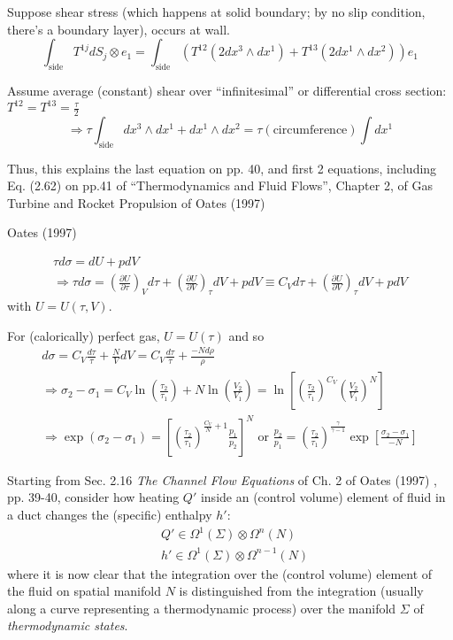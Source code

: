 \documentclass[10pt]{amsart}
\begin{document}
\begin{multicols*}{2}
Suppose shear stress (which happens at solid boundary; by no slip condition, there's a boundary layer), occurs at wall.  
\[
\int_{\text{side}}T^{1j}dS_j \otimes e_1 = \int_{\text{side}} (T^{12} (2dx^3 \wedge dx^1) + T^{13} (2dx^1 \wedge dx^2 ) ) e_1
\]

Assume average (constant) shear over ``infinitesimal'' or differential cross section: $T^{12}=T^{13} = \frac{\tau}{2}$
\[
\Longrightarrow \tau \int_{\text{side}} dx^3 \wedge dx^1 + dx^1 \wedge dx^2 = \tau (\text{circumference}) \int dx^1
\]

Thus, this explains the last equation on pp. 40, and first 2 equations, including Eq. (2.62) on pp.41 of ``Thermodynamics and Fluid Flows'', Chapter 2, of  Gas Turbine and Rocket Propulsion of Oates (1997) \cite{GOates1997}



Oates (1997) \cite{GOates1997}

\[
\begin{gathered}
  \tau d\sigma = dU + pdV \\
  \Longrightarrow \tau d\sigma = \left( \frac{ \partial U}{ \partial \tau} \right)_V d\tau  + \left( \frac{ \partial U}{ \partial V} \right)_{\tau} dV + p dV \equiv C_V d\tau + \left( \frac{ \partial U}{ \partial V} \right)_{\tau} dV + pdV
\end{gathered}
\]
with $U = U(\tau,V)$.  

For (calorically) perfect gas, $U=U(\tau)$ and so
\[
\begin{gathered}
  d\sigma = C_V \frac{d\tau}{\tau} + \frac{N}{V} dV = C_V \frac{d\tau}{\tau} + \frac{-Nd\rho }{\rho} \\
  \Longrightarrow \sigma_2 - \sigma_1 = C_V \ln{ \left( \frac{\tau_2}{\tau_1} \right) } + N \ln{ \left( \frac{V_2}{V_1} \right)} = \ln{ \left[ \left( \frac{\tau_2}{\tau_1} \right)^{C_V} \left( \frac{V_2}{V_1} \right)^N \right] } \\
  \Longrightarrow \exp{ ( \sigma_2 - \sigma_1) } = \left[ \left( \frac{\tau_2}{\tau_1} \right)^{ \frac{C_V}{N} + 1 } \frac{p_1}{p_2} \right]^{N} \text{ or } \frac{p_2}{p_1} = \left( \frac{\tau_2}{\tau_1} \right)^{\frac{\gamma}{\gamma-1}} \exp{ \left[ \frac{\sigma_2-\sigma_1}{-N} \right] }
\end{gathered}
\]

Starting from Sec. 2.16 \emph{The Channel Flow Equations} of Ch. 2 of Oates (1997) \cite{GOates1997}, pp. 39-40, consider how heating $Q'$ inside an (control volume) element of fluid in a duct changes the (specific) enthalpy $h'$:
\[
\begin{aligned}
  & Q' \in \Omega^1(\Sigma) \otimes \Omega^n(N) \\ 
  & h' \in \Omega^1(\Sigma) \otimes \Omega^{n-1}(N)
\end{aligned}
\]
where it is now clear that the integration over the (control volume) element of the fluid on spatial manifold $N$ is distinguished from the integration (usually along a curve representing a thermodynamic process) over the manifold $\Sigma$ of \emph{thermodynamic states}.  


\end{multicols*}
\end{document}
